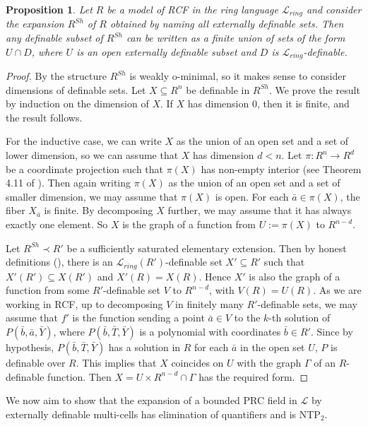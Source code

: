 \documentclass[12pt]{article}
\newtheorem{prop}[thm]{Proposition}
\theoremstyle{definition}
\theoremstyle{mystyle}
\theoremstyle{remark}
\newcommand{\LC}{\mathcal{L}}
\begin{document}
\begin{prop}\label{prop_extrcf}
Let $R$ be a model of RCF in the ring language $\mathcal L_{ring}$ and consider the expansion $R^{Sh}$ of $R$ obtained by naming all externally definable sets. Then any definable subset of $R^{Sh}$ can be written as a finite union of sets of the form $U\cap D$, where $U$ is an open externally definable subset and $D$ is $\mathcal L_{ring}$-definable.
\end{prop}
\begin{proof}
By \cite{BaPo} the structure $R^{Sh}$ is weakly o-minimal, so it makes sense to consider dimensions of definable sets. Let $X\subseteq R^n$ be definable in $R^{Sh}$. We prove the result by induction on the dimension of $X$. If $X$ has dimension 0, then it is finite, and the result follows.

For the inductive case, we can write $X$ as the union of an open set and a set of lower dimension, so we can assume that $X$ has dimension $d<n$. Let $\pi:R^n \to R^d$ be a coordinate projection such that $\pi(X)$ has non-empty interior (see Theorem 4.11 of \cite{MMS}). Then again writing $\pi(X)$ as the union of an open set and a set of smaller dimension, we may assume that $\pi(X)$ is open. For each $\bar a \in \pi(X)$, the fiber $X_{\bar a}$ is finite. By decomposing $X$ further, we may assume that it has always exactly one element. So $X$ is the graph of a function from $U:=\pi(X)$ to $R^{n-d}$.

Let $R^{Sh} \prec R'$ be a sufficiently saturated elementary extension. Then by honest definitions (\cite[Chapter 3]{NIPbook}), there is an $\mathcal L_{ring}(R')$-definable set $X' \subseteq R'$ such that $X'(R') \subseteq X(R')$ and $X'(R) = X(R)$. Hence $X'$ is also the graph of a function from some $R'$-definable set $V$ to $R^{n-d}$, with $V(R)=U(R)$. As we are working in RCF, up to decomposing $V$ in finitely many $R'$-definable sets, we may assume that $f'$ is the function sending a point $\bar a\in V$ to the $k$-th solution of $P(\bar b,\bar a,\bar Y)$, where $P(\bar b,\bar T,\bar Y)$ is a polynomial with coordinates $\bar b\in R'$. Since by hypothesis, $P(\bar b,\bar T,\bar Y)$ has a solution in $R$ for each $\bar a$ in the open set $U$, $P$ is definable over $R$. This implies that $X$ coincides on $U$ with the graph $\Gamma$ of an $R$-definable function. Then $X=U\times R^{n-d} \cap \Gamma$ has the required form.
\end{proof}

We now aim to show that the expansion of a bounded PRC field
in $\LC$ by externally definable multi-cells has elimination of
quantifiers and is NTP$_2$.
\end{document}
